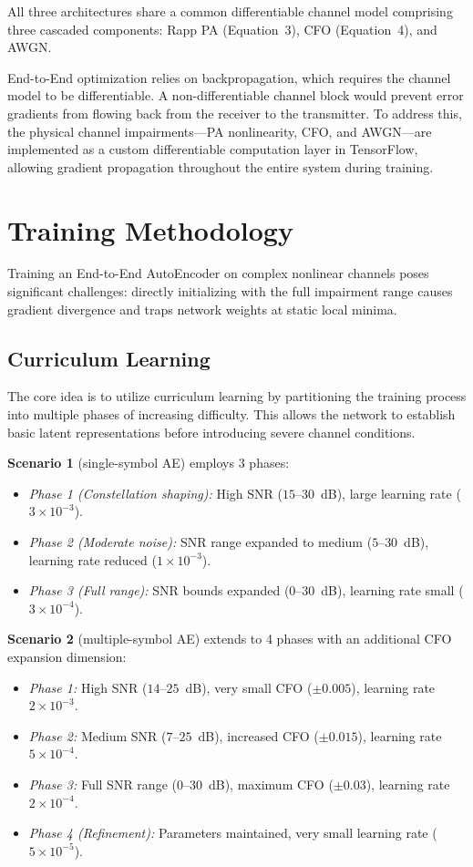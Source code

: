 \documentclass[a4paper,14pt]{extreport}
\begin{document}
All three architectures share a common differentiable channel model comprising three cascaded components: Rapp PA (Equation~3), CFO (Equation~4), and AWGN.

End-to-End optimization relies on backpropagation, which requires the channel model to be differentiable. A non-differentiable channel block would prevent error gradients from flowing back from the receiver to the transmitter. To address this, the physical channel impairments---PA nonlinearity, CFO, and AWGN---are implemented as a custom differentiable computation layer in TensorFlow, allowing gradient propagation throughout the entire system during training.

\section{Training Methodology}

Training an End-to-End AutoEncoder on complex nonlinear channels poses significant challenges: directly initializing with the full impairment range causes gradient divergence and traps network weights at static local minima.

\subsection{Curriculum Learning}

The core idea is to utilize curriculum learning by partitioning the training process into multiple phases of increasing difficulty. This allows the network to establish basic latent representations before introducing severe channel conditions.

\textbf{Scenario 1} (single-symbol AE) employs 3 phases:
\begin{itemize}
    \item \emph{Phase 1 (Constellation shaping):} High SNR ($15$--$30$~dB), large learning rate ($3 \times 10^{-3}$).
    \item \emph{Phase 2 (Moderate noise):} SNR range expanded to medium ($5$--$30$~dB), learning rate reduced ($1 \times 10^{-3}$).
    \item \emph{Phase 3 (Full range):} SNR bounds expanded ($0$--$30$~dB), learning rate small ($3 \times 10^{-4}$).
\end{itemize}

\textbf{Scenario 2} (multiple-symbol AE) extends to 4 phases with an additional CFO expansion dimension:
\begin{itemize}
    \item \emph{Phase 1:} High SNR ($14$--$25$~dB), very small CFO ($\pm 0.005$), learning rate $2 \times 10^{-3}$.
    \item \emph{Phase 2:} Medium SNR ($7$--$25$~dB), increased CFO ($\pm 0.015$), learning rate $5 \times 10^{-4}$.
    \item \emph{Phase 3:} Full SNR range ($0$--$30$~dB), maximum CFO ($\pm 0.03$), learning rate $2 \times 10^{-4}$.
    \item \emph{Phase 4 (Refinement):} Parameters maintained, very small learning rate ($5 \times 10^{-5}$).
\end{itemize}
\end{document}
